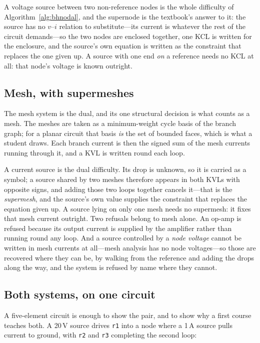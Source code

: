\documentclass[11pt,oneside]{report}
\newcommand{\code}[1]{\texttt{#1}}
\begin{document}
A voltage source between two non-reference nodes is the whole
difficulty of Algorithm~\ref{alg:bhnodal}, and the supernode is the
textbook's answer to it: the
source has no $v$--$i$ relation to substitute---its current is
whatever the rest of the circuit demands---so the two nodes are
enclosed together, one KCL is written for the enclosure, and the
source's own equation is written as the constraint that replaces the
one given up. A source with one end \emph{on} a reference needs no KCL
at all: that node's voltage is known outright.

\subsection{Mesh, with supermeshes}

The mesh system is the dual, and its one structural decision is what
counts as a mesh. The meshes are taken as a minimum-weight cycle basis
of the branch graph; for a planar circuit that basis \emph{is} the set
of bounded faces, which is what a student draws. Each branch current
is then the signed sum of the mesh currents running through it, and a
KVL is written round each loop.

A current source is the dual difficulty. Its drop is unknown, so it is
carried as a symbol; a source shared by two meshes therefore appears
in both KVLs with opposite signs, and adding those two loops together
cancels it---that is the \emph{supermesh}, and the source's own value
supplies the constraint that replaces the equation given up. A source
lying on only one mesh needs no supermesh: it fixes that mesh current
outright. Two refusals belong to mesh alone. An op-amp is refused
because its output current is supplied by the amplifier rather than
running round any loop. And a source controlled by a \emph{node
voltage} cannot be written in mesh currents at all---mesh analysis has
no node voltages---so those are recovered where they can be, by
walking from the reference and adding the drops along the way, and
the system is refused by name where they cannot.

\subsection{Both systems, on one circuit}

A five-element circuit is enough to show the pair, and to show why a
first course teaches both. A 20\,V source drives \code{r1} into a node
where a 1\,A source pulls current to ground, with \code{r2} and
\code{r3} completing the second loop:
\end{document}
